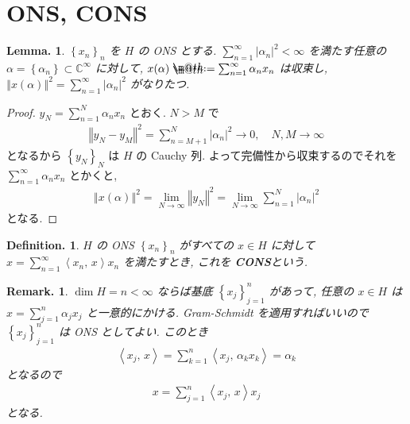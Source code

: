 \documentclass[openany, a4paper, oneside]{jsbook}
\makeatletter
\newcommand*{\defeq}{\mathrel{\rlap{%
\raisebox{0.3ex}{$\m@th\cdot$}}%
\raisebox{-0.3ex}{$\m@th\cdot$}}%
=}
\theoremstyle{break}
\newtheorem{lem}[thm]{Lemma.}
\theoremstyle{breakdefn}
\newtheorem{defn}[thm]{Definition.}
\newtheorem{rem}[thm]{Remark.}
\newcommand{\abs}[1]{\left|#1\right|}
\newcommand{\norm}[1]{\left\Vert#1\right\Vert}
\newcommand{\rbk}[1]{\left (#1\right)}
\newcommand{\cbk}[1]{\left\{#1\right\}}
\newcommand{\bkt}[2]{\left\langle#1,\,#2\right\rangle}
\newcommand{\bbC}{\mathbb{C}}
\newcommand{\upbf}[1]{\textup{\textbf{#1}}}
\makeatother
\begin{document}
\section{ONS, CONS}


\begin{lem}\label{functional_analysis_hilbert_space_yukimi_7}
 $\cbk{x_{n}}_{n}$ を $H$ の ONS とする.
 $\sum_{n = 1}^\infty \abs{\alpha_{n}}^2 < \infty$ を満たす任意の
 $\alpha = \cbk{\alpha_{n}} \subset \bbC^{\infty}$ に対して,
 $x (\alpha) \defeq \sum_{n = 1}^\infty \alpha_{n}x_{n}$ は収束し,
 $\norm{x \rbk{\alpha}}^2 = \sum_{n=1}^\infty \abs{\alpha_{n}}^2$ がなりたつ.
\end{lem}
\begin{proof}
$y_{N} = \sum_{n=1}^N \alpha_{n} x_{n}$ とおく.
$N > M$ で
\begin{align}
 \norm{y_N - y_M}^2
 =
 \sum_{n = M+1}^N \abs{\alpha_n}^2
 \to 0, \quad N, M \to \infty
\end{align}
となるから $\cbk{y_N}_N$ は $H$ の Cauchy 列.
よって完備性から収束するのでそれを $\sum_{n=1}^\infty \alpha_n x_n$ とかくと,
\begin{align}
 \norm{x \rbk{\alpha}}^2
 =
 \lim_{N \to \infty} \norm{y_N}^2
 =
 \lim_{N \to \infty} \sum_{n=1}^N \abs{\alpha_{n}}^2
\end{align}
となる.
\end{proof}

\begin{defn}
 $H$ の ONS $\cbk{x_{n}}_n$ がすべての $x \in H$ に対して $x = \sum_{n = 1}^\infty \bkt{{x_n}}{x} x_n$ を満たすとき,
 これを \upbf{CONS}という.
\end{defn}
\begin{rem}
 $\dim H = n < \infty$ ならば基底 $\cbk{x_{j}}_{j=1}^n$ があって,
 任意の $x \in H$ は $x = \sum_{j = 1}^n \alpha_j x_j$ と一意的にかける.
 Gram-Schmidt を適用すればいいので $\cbk{x_{j}}_{j=1}^n$ は ONS としてよい.
 このとき
 \begin{align}
  \bkt{x_j}{x}
  =
  \sum_{k=1}^n \bkt{x_j}{\alpha_k x_k}
  =
  \alpha_k
 \end{align}
 となるので
 \begin{align}
  x
  =
  \sum_{j = 1}^n \bkt{x_j}{x} x_j
 \end{align}
 となる.
\end{rem}
\end{document}
